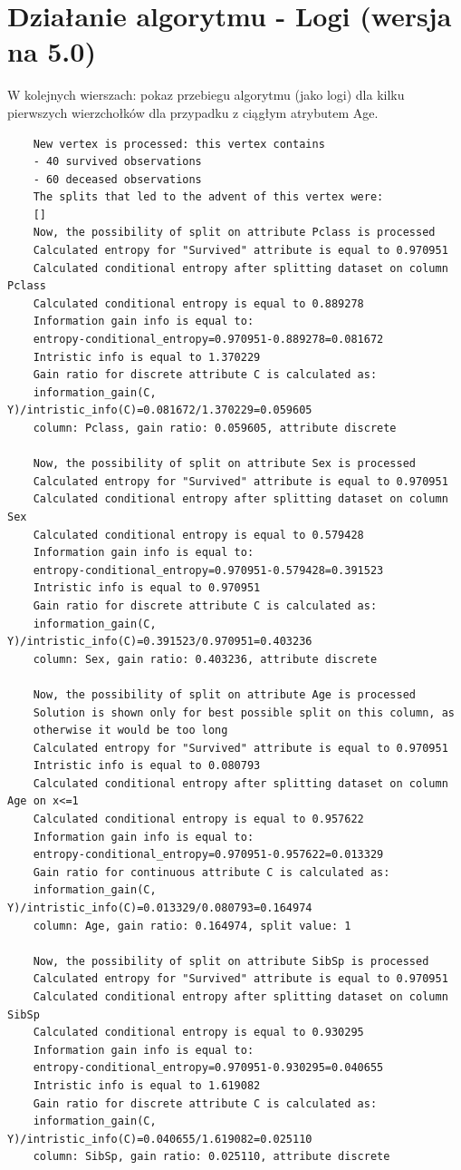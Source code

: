 \documentclass[12pt]{article}
\begin{document}
\section{Działanie algorytmu - Logi (wersja na 5.0)}
W kolejnych wierszach: pokaz przebiegu algorytmu (jako logi) dla kilku pierwszych wierzchołków dla przypadku z ciągłym atrybutem Age.
\begin{verbatim}
	New vertex is processed: this vertex contains
	- 40 survived observations
	- 60 deceased observations
	The splits that led to the advent of this vertex were:
	[]
	Now, the possibility of split on attribute Pclass is processed
	Calculated entropy for "Survived" attribute is equal to 0.970951
	Calculated conditional entropy after splitting dataset on column Pclass
	Calculated conditional entropy is equal to 0.889278
	Information gain info is equal to:
	entropy-conditional_entropy=0.970951-0.889278=0.081672
	Intristic info is equal to 1.370229
	Gain ratio for discrete attribute C is calculated as:
	information_gain(C, Y)/intristic_info(C)=0.081672/1.370229=0.059605
	column: Pclass, gain ratio: 0.059605, attribute discrete
	
	Now, the possibility of split on attribute Sex is processed
	Calculated entropy for "Survived" attribute is equal to 0.970951
	Calculated conditional entropy after splitting dataset on column Sex
	Calculated conditional entropy is equal to 0.579428
	Information gain info is equal to:
	entropy-conditional_entropy=0.970951-0.579428=0.391523
	Intristic info is equal to 0.970951
	Gain ratio for discrete attribute C is calculated as:
	information_gain(C, Y)/intristic_info(C)=0.391523/0.970951=0.403236
	column: Sex, gain ratio: 0.403236, attribute discrete
	
	Now, the possibility of split on attribute Age is processed
	Solution is shown only for best possible split on this column, as
	otherwise it would be too long
	Calculated entropy for "Survived" attribute is equal to 0.970951
	Intristic info is equal to 0.080793
	Calculated conditional entropy after splitting dataset on column Age on x<=1
	Calculated conditional entropy is equal to 0.957622
	Information gain info is equal to:
	entropy-conditional_entropy=0.970951-0.957622=0.013329
	Gain ratio for continuous attribute C is calculated as:
	information_gain(C, Y)/intristic_info(C)=0.013329/0.080793=0.164974
	column: Age, gain ratio: 0.164974, split value: 1
	
	Now, the possibility of split on attribute SibSp is processed
	Calculated entropy for "Survived" attribute is equal to 0.970951
	Calculated conditional entropy after splitting dataset on column SibSp
	Calculated conditional entropy is equal to 0.930295
	Information gain info is equal to:
	entropy-conditional_entropy=0.970951-0.930295=0.040655
	Intristic info is equal to 1.619082
	Gain ratio for discrete attribute C is calculated as:
	information_gain(C, Y)/intristic_info(C)=0.040655/1.619082=0.025110
	column: SibSp, gain ratio: 0.025110, attribute discrete
	

\end{verbatim}
\end{document}
